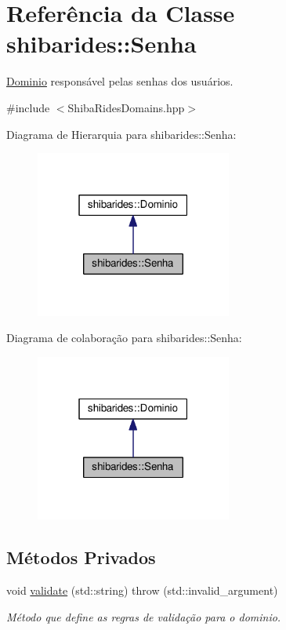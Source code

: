 \hypertarget{classshibarides_1_1Senha}{}\section{Referência da Classe shibarides\+:\+:Senha}
\label{classshibarides_1_1Senha}


\hyperlink{classshibarides_1_1Dominio}{Dominio} responsável pelas senhas dos usuários.  




{\ttfamily \#include $<$Shiba\+Rides\+Domains.\+hpp$>$}



Diagrama de Hierarquia para shibarides\+:\+:Senha\+:\nopagebreak
\begin{figure}[H]
\begin{center}
\leavevmode
\includegraphics[width=183pt]{classshibarides_1_1Senha__inherit__graph}
\end{center}
\end{figure}


Diagrama de colaboração para shibarides\+:\+:Senha\+:\nopagebreak
\begin{figure}[H]
\begin{center}
\leavevmode
\includegraphics[width=183pt]{classshibarides_1_1Senha__coll__graph}
\end{center}
\end{figure}
\subsection*{Métodos Privados}
\begin{DoxyCompactItemize}
\item 
void \hyperlink{classshibarides_1_1Senha_a733550b46c79a95df9f5f4163f0be923}{validate} (std\+::string)  throw (std\+::invalid\+\_\+argument)
\begin{DoxyCompactList}\small\item\em Método que define as regras de validação para o dominio. \end{DoxyCompactList}\end{DoxyCompactItemize}
